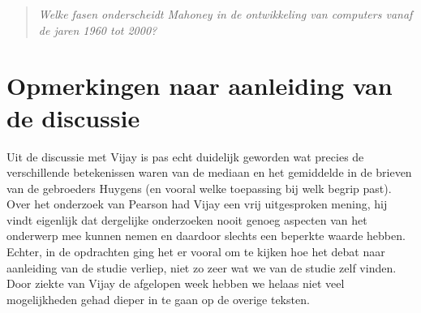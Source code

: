 \documentclass[a4paper,11pt]{article}
\begin{document}
\begin{quote}
\emph{Welke fasen onderscheidt Mahoney in de ontwikkeling van computers vanaf
  de jaren 1960 tot 2000?}
\end{quote}





\section*{Opmerkingen naar aanleiding van de discussie}


Uit de discussie met Vijay is pas echt duidelijk geworden wat precies de
verschillende betekenissen waren van de mediaan en het gemiddelde in de
brieven van de gebroeders Huygens (en vooral welke toepassing bij welk begrip
past). Over het onderzoek van Pearson had Vijay een vrij uitgesproken mening,
hij vindt eigenlijk dat dergelijke onderzoeken nooit genoeg aspecten van het
onderwerp mee kunnen nemen en daardoor slechts een beperkte waarde
hebben. Echter, in de opdrachten ging het er vooral om te kijken hoe het debat
naar aanleiding van de studie verliep, niet zo zeer wat we van de studie zelf
vinden. Door ziekte van Vijay de afgelopen week hebben we helaas niet veel
mogelijkheden gehad dieper in te gaan op de overige teksten.
\end{document}
